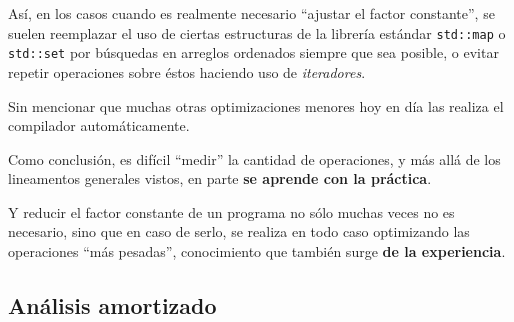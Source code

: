 \documentclass{beamer}
\begin{document}
    \begin{frame}[noframenumbering]
        Así, en los casos cuando es realmente necesario ``ajustar el factor constante'', se suelen reemplazar el uso de ciertas estructuras de la librería estándar \texttt{std::map} o \texttt{std::set} por búsquedas en arreglos ordenados siempre que sea posible, o evitar repetir operaciones sobre éstos haciendo uso de \textit{iteradores}. \pause

        Sin mencionar que muchas otras optimizaciones menores hoy en día las realiza el compilador automáticamente. \pause \vspace{8pt}

        Como conclusión, es difícil ``medir'' la cantidad de operaciones, y más allá de los lineamentos generales vistos, en parte \textbf{se aprende con la práctica}. \pause\vspace{4pt}

        Y reducir el factor constante de un programa no sólo muchas veces no es necesario, sino que en caso de serlo, se realiza en todo caso optimizando las operaciones ``más pesadas'', conocimiento que también surge \textbf{de la experiencia}.
    \end{frame}

    \subsection{Análisis amortizado}
    \begin{frame}
    \end{frame}
\end{document}
